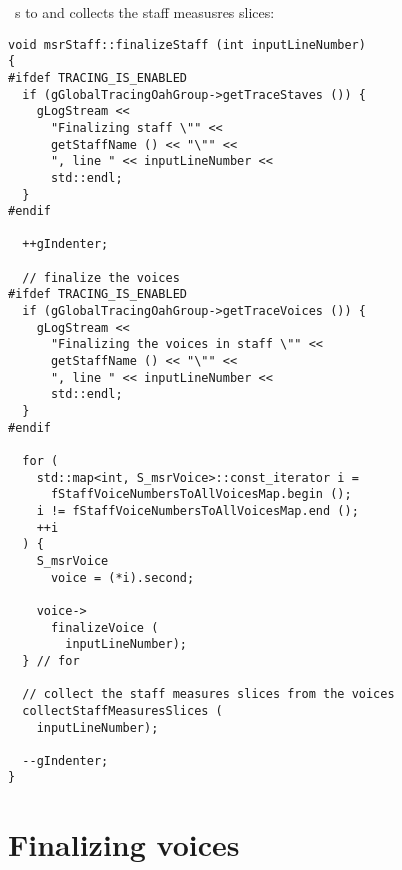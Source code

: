 \cascade\ s to  and collects the staff measusres slices:
\begin{lstlisting}[language=CPlusPlus]
void msrStaff::finalizeStaff (int inputLineNumber)
{
#ifdef TRACING_IS_ENABLED
  if (gGlobalTracingOahGroup->getTraceStaves ()) {
    gLogStream <<
      "Finalizing staff \"" <<
      getStaffName () << "\"" <<
      ", line " << inputLineNumber <<
      std::endl;
  }
#endif

  ++gIndenter;

  // finalize the voices
#ifdef TRACING_IS_ENABLED
  if (gGlobalTracingOahGroup->getTraceVoices ()) {
    gLogStream <<
      "Finalizing the voices in staff \"" <<
      getStaffName () << "\"" <<
      ", line " << inputLineNumber <<
      std::endl;
  }
#endif

  for (
    std::map<int, S_msrVoice>::const_iterator i =
      fStaffVoiceNumbersToAllVoicesMap.begin ();
    i != fStaffVoiceNumbersToAllVoicesMap.end ();
    ++i
  ) {
    S_msrVoice
      voice = (*i).second;

    voice->
      finalizeVoice (
        inputLineNumber);
  } // for

  // collect the staff measures slices from the voices
  collectStaffMeasuresSlices (
    inputLineNumber);

  --gIndenter;
}
\end{lstlisting}


\section{Finalizing voices}

